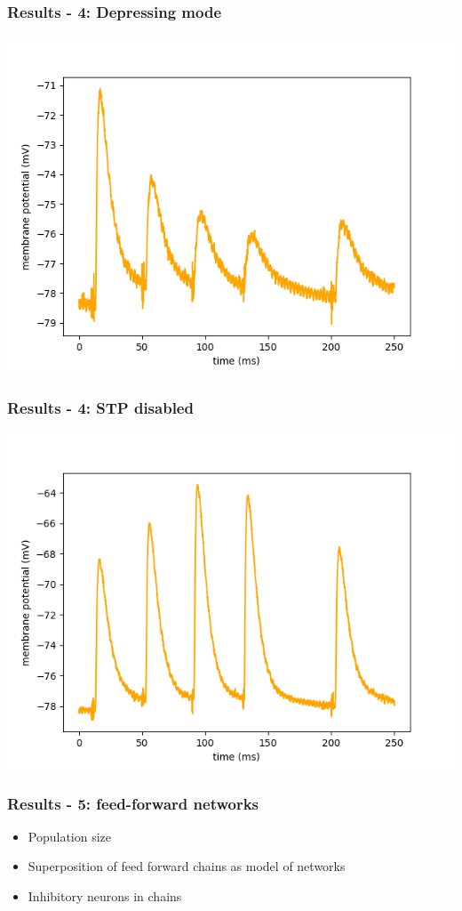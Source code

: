 \documentclass{beamer}
\begin{document}
\begin{frame}
	\frametitle{Results - 4: Depressing mode}
	\centering
	\includegraphics[width=\textwidth]{figures/stp_depressing.png}
\end{frame}
\begin{frame}
	\frametitle{Results - 4: STP disabled}
	\centering
	\includegraphics[width=\textwidth]{figures/stp_off.png}
\end{frame}


\begin{frame}
    \frametitle{Results - 5: feed-forward networks}
    \begin{itemize}
        \item Population size
        \item Superposition of feed forward chains as model of networks
        \item Inhibitory neurons in chains
    \end{itemize}
\end{frame}
\end{document}
